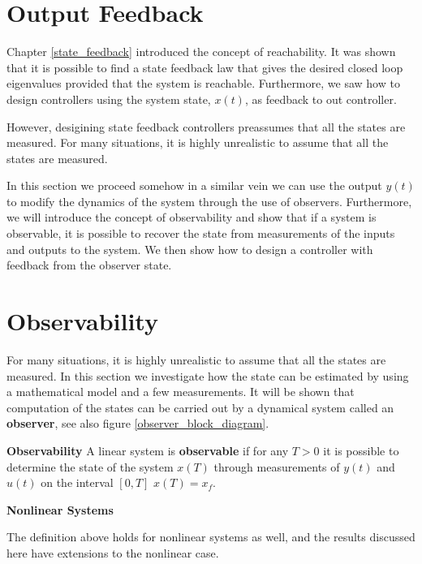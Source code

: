 \section{Output Feedback}
\label{output_feedback}

Chapter \ref{state_feedback} introduced the concept of reachability. It was shown that it is possible to find 
a state feedback law that gives the desired closed loop eigenvalues provided that the system
is reachable.  Furthermore, we saw how to design controllers using
the system state, $x(t)$, as feedback to out controller. 

However, desigining state feedback controllers preassumes that all the states are measured. For many situations, it
is highly unrealistic to assume that all the states are measured. 

In this section we proceed somehow in a similar vein we can use the output $y(t)$ to modify the dynamics of the system through the use of observers. Furthermore, we will introduce the concept of observability
and show that if a system is observable, it is possible to recover the state
from measurements of the inputs and outputs to the system. We then show how to
design a controller with feedback from the observer state. 




\section{Observability}
\label{observability}

For many situations, it is highly unrealistic to assume that all the states are measured. In this section we
investigate how the state can be estimated by using a mathematical model and a
few measurements. It will be shown that computation of the states can be carried
out by a dynamical system called an \textbf{observer}, see also figure \ref{observer_block_diagram}.


\begin{framed}
\theoremstyle{definition}
\begin{definition}{\textbf{Observability}}
A linear system is \textbf{observable}  if for any $T>0$ it is possible to determine the state of the system $x(T)$ through measurements of $y(t)$ and $u(t)$ on the interval $[0,T]$  $x(T) = x_f$.
\end{definition}
\end{framed}


\begin{framed}
\theoremstyle{remark}
\begin{remark}{\textbf{Nonlinear Systems}}

The definition above holds for nonlinear systems as well, and the results discussed here have extensions to the nonlinear case.
\end{remark}
\end{framed}



